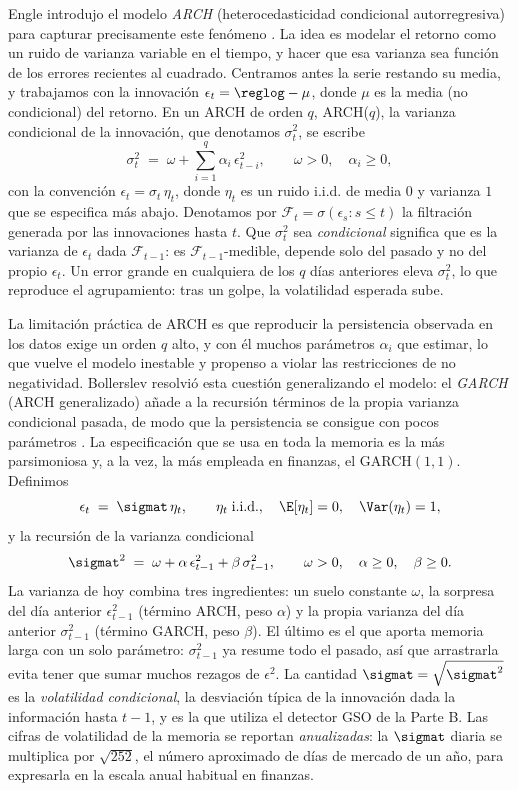 Engle introdujo el modelo \emph{ARCH} (heterocedasticidad condicional autorregresiva) para capturar precisamente este fenómeno \cite{engle1982}. La idea es modelar el retorno como un ruido de varianza variable en el tiempo, y hacer que esa varianza sea función de los errores recientes al cuadrado. Centramos antes la serie restando su media, y trabajamos con la innovación $\epsilon_t = \reglog - \mu$, donde $\mu$ es la media (no condicional) del retorno. En un ARCH de orden $q$, ARCH($q$), la varianza condicional de la innovación, que denotamos $\sigma_t^2$, se escribe
\[
\sigma_t^2 \;=\; \omega + \sum_{i=1}^{q} \alpha_i\, \epsilon_{t-i}^2,
\qquad \omega > 0, \quad \alpha_i \ge 0,
\]
con la convención $\epsilon_t = \sigma_t\, \eta_t$, donde $\eta_t$ es un ruido i.i.d. de media $0$ y varianza $1$ que se especifica más abajo. Denotamos por $\mathcal{F}_t = \sigma(\epsilon_s : s \le t)$ la filtración generada por las innovaciones hasta $t$. Que $\sigma_t^2$ sea \emph{condicional} significa que es la varianza de $\epsilon_t$ dada $\mathcal{F}_{t-1}$: es $\mathcal{F}_{t-1}$-medible, depende solo del pasado y no del propio $\epsilon_t$. Un error grande en cualquiera de los $q$ días anteriores eleva $\sigma_t^2$, lo que reproduce el agrupamiento: tras un golpe, la volatilidad esperada sube.

La limitación práctica de ARCH es que reproducir la persistencia observada en los datos exige un orden $q$ alto, y con él muchos parámetros $\alpha_i$ que estimar, lo que vuelve el modelo inestable y propenso a violar las restricciones de no negatividad. Bollerslev resolvió esta cuestión generalizando el modelo: el \emph{GARCH} (ARCH generalizado) añade a la recursión términos de la propia varianza condicional pasada, de modo que la persistencia se consigue con pocos parámetros \cite{bollerslev1986}. La especificación que se usa en toda la memoria es la más parsimoniosa y, a la vez, la más empleada en finanzas, el GARCH$(1,1)$. Definimos
\[
\epsilon_t \;=\; \sigmat\, \eta_t, \qquad \eta_t \;\text{i.i.d.}, \quad \E[\eta_t] = 0, \quad \Var(\eta_t) = 1,
\]
y la recursión de la varianza condicional
\begin{equation}
\label{eq:garch11}
\sigmat^2 \;=\; \omega + \alpha\, \epsilon_{t-1}^2 + \beta\, \sigma_{t-1}^2,
\qquad \omega > 0, \quad \alpha \ge 0, \quad \beta \ge 0.
\end{equation}
La varianza de hoy combina tres ingredientes: un suelo constante $\omega$, la sorpresa del día anterior $\epsilon_{t-1}^2$ (término ARCH, peso $\alpha$) y la propia varianza del día anterior $\sigma_{t-1}^2$ (término GARCH, peso $\beta$). El último es el que aporta memoria larga con un solo parámetro: $\sigma_{t-1}^2$ ya resume todo el pasado, así que arrastrarla evita tener que sumar muchos rezagos de $\epsilon^2$. La cantidad $\sigmat = \sqrt{\sigmat^2}$ es la \emph{volatilidad condicional}, la desviación típica de la innovación dada la información hasta $t-1$, y es la que utiliza el detector GSO de la Parte B. Las cifras de volatilidad de la memoria se reportan \emph{anualizadas}: la $\sigmat$ diaria se multiplica por $\sqrt{252}$, el número aproximado de días de mercado de un año, para expresarla en la escala anual habitual en finanzas.

